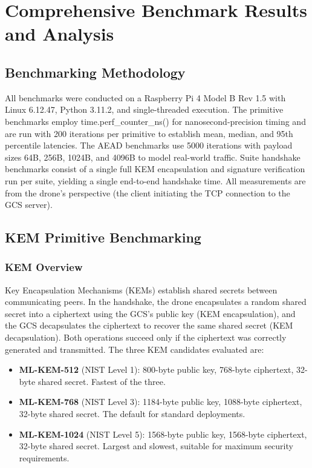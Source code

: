 \documentclass[conference]{IEEEtran}
\begin{document}
\section{Comprehensive Benchmark Results and Analysis}

\subsection{Benchmarking Methodology}

All benchmarks were conducted on a Raspberry Pi 4 Model B Rev 1.5 with Linux 6.12.47, Python 3.11.2, and single-threaded execution. The primitive benchmarks employ time.perf\_counter\_ns() for nanosecond-precision timing and are run with 200 iterations per primitive to establish mean, median, and 95th percentile latencies. The AEAD benchmarks use 5000 iterations with payload sizes 64B, 256B, 1024B, and 4096B to model real-world traffic. Suite handshake benchmarks consist of a single full KEM encapsulation and signature verification run per suite, yielding a single end-to-end handshake time. All measurements are from the drone's perspective (the client initiating the TCP connection to the GCS server).

\subsection{KEM Primitive Benchmarking}

\subsubsection{KEM Overview}

Key Encapsulation Mechanisms (KEMs) establish shared secrets between communicating peers. In the handshake, the drone encapsulates a random shared secret into a ciphertext using the GCS's public key (KEM encapsulation), and the GCS decapsulates the ciphertext to recover the same shared secret (KEM decapsulation). Both operations succeed only if the ciphertext was correctly generated and transmitted. The three KEM candidates evaluated are:

\begin{itemize}[leftmargin=*]
\item \textbf{ML-KEM-512} (NIST Level 1): 800-byte public key, 768-byte ciphertext, 32-byte shared secret. Fastest of the three.
\item \textbf{ML-KEM-768} (NIST Level 3): 1184-byte public key, 1088-byte ciphertext, 32-byte shared secret. The default for standard deployments.
\item \textbf{ML-KEM-1024} (NIST Level 5): 1568-byte public key, 1568-byte ciphertext, 32-byte shared secret. Largest and slowest, suitable for maximum security requirements.
\end{itemize}
\end{document}

